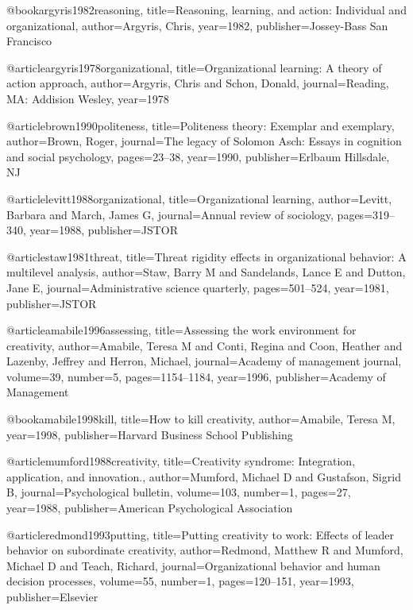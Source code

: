 @book{argyris1982reasoning,
  title={Reasoning, learning, and action: Individual and organizational},
  author={Argyris, Chris},
  year={1982},
  publisher={Jossey-Bass San Francisco}
}

@article{argyris1978organizational,
  title={Organizational learning: A theory of action approach},
  author={Argyris, Chris and Schon, Donald},
  journal={Reading, MA: Addision Wesley},
  year={1978}
}

@article{brown1990politeness,
  title={Politeness theory: Exemplar and exemplary},
  author={Brown, Roger},
  journal={The legacy of Solomon Asch: Essays in cognition and social psychology},
  pages={23--38},
  year={1990},
  publisher={Erlbaum Hillsdale, NJ}
}

@article{levitt1988organizational,
  title={Organizational learning},
  author={Levitt, Barbara and March, James G},
  journal={Annual review of sociology},
  pages={319--340},
  year={1988},
  publisher={JSTOR}
}

@article{staw1981threat,
  title={Threat rigidity effects in organizational behavior: A multilevel analysis},
  author={Staw, Barry M and Sandelands, Lance E and Dutton, Jane E},
  journal={Administrative science quarterly},
  pages={501--524},
  year={1981},
  publisher={JSTOR}
}

@article{amabile1996assessing,
  title={Assessing the work environment for creativity},
  author={Amabile, Teresa M and Conti, Regina and Coon, Heather and Lazenby, Jeffrey and Herron, Michael},
  journal={Academy of management journal},
  volume={39},
  number={5},
  pages={1154--1184},
  year={1996},
  publisher={Academy of Management}
}

@book{amabile1998kill,
  title={How to kill creativity},
  author={Amabile, Teresa M},
  year={1998},
  publisher={Harvard Business School Publishing}
}

@article{mumford1988creativity,
  title={Creativity syndrome: Integration, application, and innovation.},
  author={Mumford, Michael D and Gustafson, Sigrid B},
  journal={Psychological bulletin},
  volume={103},
  number={1},
  pages={27},
  year={1988},
  publisher={American Psychological Association}
}

@article{redmond1993putting,
  title={Putting creativity to work: Effects of leader behavior on subordinate creativity},
  author={Redmond, Matthew R and Mumford, Michael D and Teach, Richard},
  journal={Organizational behavior and human decision processes},
  volume={55},
  number={1},
  pages={120--151},
  year={1993},
  publisher={Elsevier}
}

